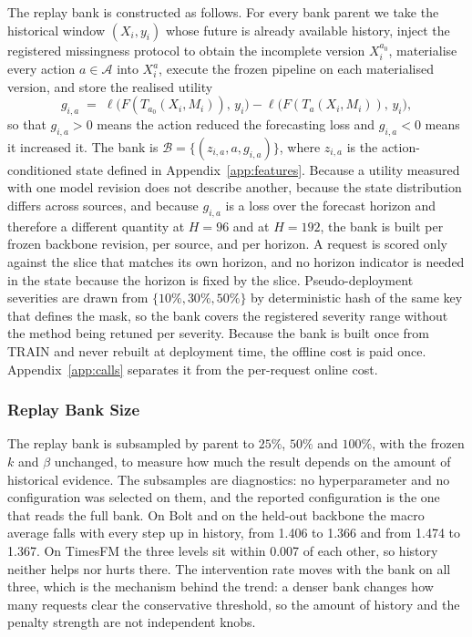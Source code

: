 \documentclass{article}
\newcommand{\calA}{\mathcal{A}}
\newcommand{\calB}{\mathcal{B}}
\newcommand{\loss}{\ell}
\begin{document}
The replay bank is constructed as follows. For every bank parent we take the historical
window $(X_i, y_i)$ whose future is already available history, inject the registered
missingness protocol to obtain the incomplete version $X_i^{a_0}$, materialise every action
$a \in \calA$ into $X_i^{a}$, execute the frozen pipeline on each materialised version, and
store the realised utility
\begin{equation}
  g_{i,a} \;=\; \loss\big(F(T_{a_0}(X_i, M_i)),\, y_i\big) - \loss\big(F(T_{a}(X_i, M_i)),\, y_i\big),
  \label{eq:app-gain}
\end{equation}
so that $g_{i,a} > 0$ means the action reduced the forecasting loss and $g_{i,a} < 0$ means it
increased it. The bank is
$\calB = \{(z_{i,a}, a, g_{i,a})\}$, where $z_{i,a}$ is the action-conditioned state defined
in Appendix~\ref{app:features}. Because a utility measured with one model revision does not
describe another, because the state distribution differs across sources, and because $g_{i,a}$
is a loss over the forecast horizon and therefore a different quantity at $H=96$ and at
$H=192$, the bank is built per frozen backbone revision, per source, and per horizon. A request
is scored only against the slice that matches its own horizon, and no horizon indicator is
needed in the state because the horizon is fixed by the slice. Pseudo-deployment severities are drawn from
$\{10\%, 30\%, 50\%\}$ by deterministic hash of the same key that defines the mask, so the
bank covers the registered severity range without the method being retuned per severity.
Because the bank is built once from TRAIN and never rebuilt at deployment time, the offline
cost is paid once. Appendix~\ref{app:calls} separates it from the per-request online cost.

\subsubsection{Replay Bank Size}
\label{app:replaysize}
The replay bank is subsampled by parent to $25\%$, $50\%$ and $100\%$, with the frozen $k$ and
$\beta$ unchanged, to measure how much the result depends on the amount of historical evidence.
The subsamples are diagnostics: no hyperparameter and no configuration was selected on them,
and the reported configuration is the one that reads the full bank. On Bolt and on the
held-out backbone the macro average falls with every step up in history, from 1.406
to 1.366 and from 1.474 to 1.367. On TimesFM the three levels
sit within 0.007 of each other, so history neither helps nor hurts there. The
intervention rate moves with the bank on all three, which is the mechanism behind the trend:
a denser bank changes how many requests clear the conservative threshold, so the amount of
history and the penalty strength are not independent knobs.
\end{document}
